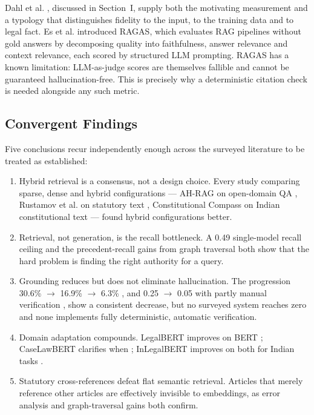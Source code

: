 \documentclass[conference]{IEEEtran}
\begin{document}
Dahl et al. \cite{dahl2024}, discussed in Section~I, supply both the motivating measurement and a typology that distinguishes fidelity to the input, to the training data and to legal fact. Es et al. \cite{es2023} introduced RAGAS, which evaluates RAG pipelines without gold answers by decomposing quality into faithfulness, answer relevance and context relevance, each scored by structured LLM prompting. RAGAS has a known limitation: LLM-as-judge scores are themselves fallible and cannot be guaranteed hallucination-free. This is precisely why a deterministic citation check is needed alongside any such metric.

\subsection{Convergent Findings}

Five conclusions recur independently enough across the surveyed literature to be treated as established:

\begin{enumerate}
\item Hybrid retrieval is a consensus, not a design choice. Every study comparing sparse, dense and hybrid configurations --- AH-RAG on open-domain QA \cite{sun2025}, Rustamov et al. on statutory text \cite{rustamov2025}, Constitutional Compass on Indian constitutional text \cite{bolla2026} --- found hybrid configurations better.
\item Retrieval, not generation, is the recall bottleneck. A 0.49 single-model recall ceiling \cite{rustamov2025} and the precedent-recall gains from graph traversal \cite{bindra2026} both show that the hard problem is finding the right authority for a query.
\item Grounding reduces but does not eliminate hallucination. The progression 30.6\% $\rightarrow$ 16.9\% $\rightarrow$ 6.3\% \cite{bindra2026}, and 0.25 $\rightarrow$ 0.05 with partly manual verification \cite{dixit2025}, show a consistent decrease, but no surveyed system reaches zero and none implements fully deterministic, automatic verification.
\item Domain adaptation compounds. LegalBERT improves on BERT \cite{chalkidis2020}; CaseLawBERT clarifies when \cite{zheng2021}; InLegalBERT improves on both for Indian tasks \cite{paul2023}.
\item Statutory cross-references defeat flat semantic retrieval. Articles that merely reference other articles are effectively invisible to embeddings, as error analysis \cite{rustamov2025} and graph-traversal gains \cite{bindra2026} both confirm.
\end{enumerate}
\end{document}

